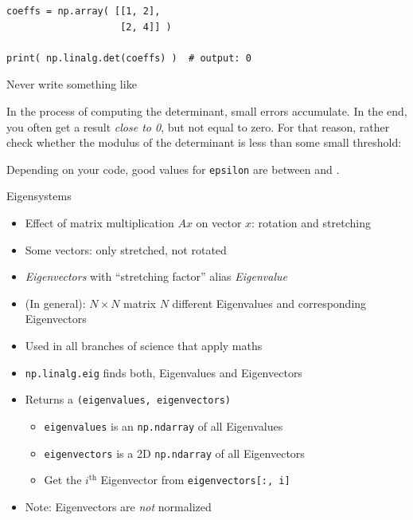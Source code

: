 
\begin{frame}[fragile]
%
\begin{codebox}
\begin{verbatim}
coeffs = np.array( [[1, 2],
                    [2, 4]] )

print( np.linalg.det(coeffs) )  # output: 0
\end{verbatim}
\end{codebox}
%
\begin{warnbox}
\footnotesize
Never write something like


In the process of computing the determinant, small errors accumulate. In the end, you often get a result \emph{close to 0}, but not equal to zero. For that reason, rather check whether the modulus of the determinant is less than some small threshold:


Depending on your code, good values for \texttt{epsilon} are between  and .
\end{warnbox}
%
\end{frame}


\begin{frame}[fragile]{Eigensystems}
%
\begin{itemize}
\item Effect of matrix multiplication $Ax$ on vector $x$: rotation and stretching
\item Some vectors: only stretched, not rotated
\item[\Thus] \emph{Eigenvectors} with \enquote{stretching factor} alias \emph{Eigenvalue}
\item (In general): $N \times N$ matrix \Thus $N$ different Eigenvalues and corresponding Eigenvectors
\item Used in all branches of science that apply maths
\item \texttt{np.linalg.eig} finds both, Eigenvalues and Eigenvectors
\item Returns a  \texttt{(eigenvalues, eigenvectors)}
	\begin{itemize}
	\item \texttt{eigenvalues} is an \texttt{np.ndarray} of all Eigenvalues
	\item \texttt{eigenvectors} is a 2D \texttt{np.ndarray} of all Eigenvectors
	\item Get the $i^{\text{th}}$ Eigenvector from \texttt{eigenvectors[:, i]}
	\end{itemize}
\item Note: Eigenvectors are \emph{not} normalized
\end{itemize}
%
\end{frame}

